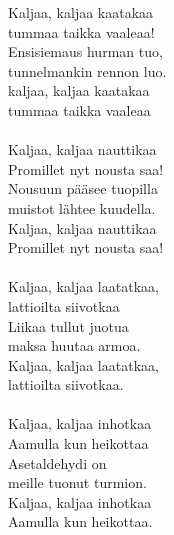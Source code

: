 
            Kaljaa, kaljaa kaatakaa \\
            tummaa taikka vaaleaa! \\
            Ensisiemaus hurman tuo, \\
            tunnelmankin rennon luo. \\
            kaljaa, kaljaa kaatakaa \\
            tummaa taikka vaaleaa \\
\hspace{10mm} \\
            Kaljaa, kaljaa nauttikaa \\
            Promillet nyt nousta saa! \\
            Nousuun pääsee tuopilla \\
            muistot lähtee kuudella. \\
            Kaljaa, kaljaa nauttikaa \\
            Promillet nyt nousta saa! \\
\hspace{10mm} \\
            Kaljaa, kaljaa laatatkaa, \\
            lattioilta siivotkaa \\
            Liikaa tullut juotua \\
            maksa huutaa armoa. \\
            Kaljaa, kaljaa laatatkaa, \\
            lattioilta siivotkaa. \\
\hspace{10mm} \\
            Kaljaa, kaljaa inhotkaa \\
            Aamulla kun heikottaa \\
            Asetaldehydi on \\
            meille tuonut turmion. \\
            Kaljaa, kaljaa inhotkaa \\
            Aamulla kun heikottaa. \\
